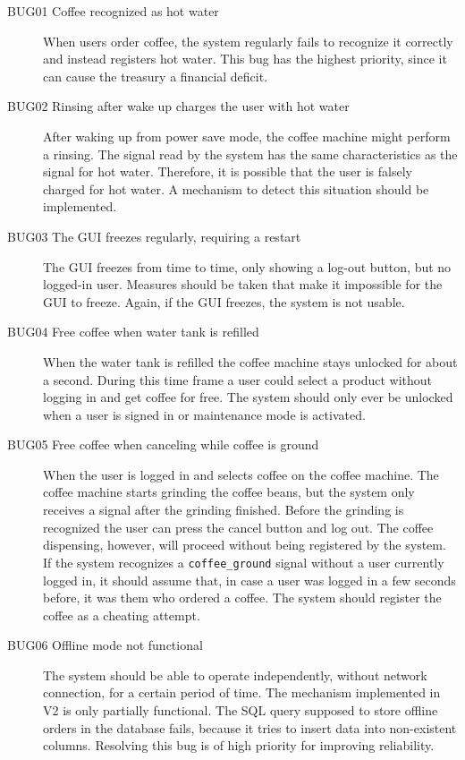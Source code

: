 \documentclass[12pt]{article}
\begin{document}
\begin{description}
\item [BUG01 Coffee recognized as hot water]
\label{pa:BUG01}
When users order coffee, the system regularly fails to recognize it correctly and instead registers hot water.
This bug has the highest priority, since it can cause the treasury a financial deficit.

\item [BUG02 Rinsing after wake up charges the user with hot water]\hspace*{\fill}
\label{pa:BUG02}
After waking up from power save mode, the coffee machine might perform a rinsing.
The signal read by the system has the same characteristics as the signal for hot water.
Therefore, it is possible that the user is falsely charged for hot water.
A mechanism to detect this situation should be implemented.

\item [BUG03 The GUI freezes regularly, requiring a restart]\hspace*{\fill}
\label{pa:BUG03}
The GUI freezes from time to time, only showing a log-out button, but no logged-in user.
Measures should be taken that make it impossible for the GUI to freeze.
Again, if the GUI freezes, the system is not usable.

\item [BUG04 Free coffee when water tank is refilled]
\label{itm:BUG04}
When the water tank is refilled the coffee machine stays unlocked for about a second.
During this time frame a user could select a product without logging in and get coffee for free.
The system should only ever be unlocked when a user is signed in or maintenance mode is activated.

\item [BUG05 Free coffee when canceling while coffee is ground] \hspace*{\fill}
\label{itm:BUG05} 
When the user is logged in and selects coffee on the coffee machine.
The coffee machine starts grinding the coffee beans,
but the system only receives a signal after the grinding finished.
Before the grinding is recognized the user can press the cancel button and log out.
The coffee dispensing, however, will proceed without being registered by the system.
If the system recognizes a \texttt{coffee\_ground} signal without a user currently logged in, 
it should assume that, in case a user was logged in a few seconds before, it was them who ordered a coffee.
The system should register the coffee as a cheating attempt.

\item [BUG06 Offline mode not functional]
\label{pa:BUG06}
The system should be able to operate independently, without network connection, for a certain period of time.
The mechanism implemented in V2 is only partially functional.
The SQL query supposed to store offline orders in the database fails,
because it tries to insert data into non-existent columns.
Resolving this bug is of high priority for improving reliability.


\end{description}
\end{document}
